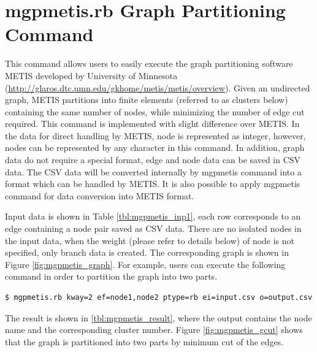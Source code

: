 

%


\section{mgpmetis.rb Graph Partitioning Command \label{sect:mgpmetis}}
This command allows users to easily execute the graph partitioning software METIS developed by University of Minnesota (\url{http://glaros.dtc.umn.edu/gkhome/metis/metis/overview}). 
Given an undirected graph, METIS partitions into finite elements (referred to as clusters below) containing the same number of nodes, while minimizing the number of edge cut required. 
This command is  implemented with slight difference over METIS. In the data for direct handling by METIS, node is represented as integer, however, nodes can be represented by any character in this command. In addition, graph data do not require a special format, edge and node data can be saved in CSV data. The CSV data will be converted internally by mgpmetis command into a format which can be handled by METIS. It is also possible to apply mgpmetis command for data conversion into METIS format.  

Input data is shown in Table \ref{tbl:mgpmetis_inp1},  each row corresponds to an edge containing a node pair saved as CSV data. There are no isolated nodes in the input data, when the weight (please refer to details below) of node is not specified, only branch data is created. 
The corresponding graph is shown in Figure \ref{fig:mgpmetis_graph}. 
For example, users can execute the following command in order to partition the graph into two parts. 

\begin{verbatim}
$ mgpmetis.rb kway=2 ef=node1,node2 ptype=rb ei=input.csv o=output.csv
\end{verbatim}

The result is shown in \ref{tbl:mgpmetis_result}, where the output contains the node name and the corresponding cluster number.   Figure \ref{fig:mgpmetis_gcut} shows that the graph is partitioned into two parts by  minimum cut of the edges.  


